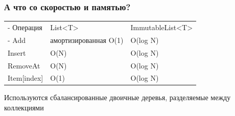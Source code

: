 \documentclass[xetex,mathserif,serif]{beamer}
\begin{document}
	\begin{frame}
		\frametitle{А что со скоростью и памятью?}
		\begin{footnotesize}
			\begin{tabu} {| X[0.9 l p] | X[1 l p] | X[1 l p] |}
				\tabucline-
				Операция     & List<T>                & ImmutableList<T>  \\
				\tabucline-
				\everyrow{\tabucline-}
				Add          & амортизированная O(1)  & O(log N)          \\
				Insert       & O(N)                   & O(log N)          \\
				RemoveAt     & O(N)                   & O(log N)          \\
				Item[index]  & O(1)                   & O(log N)          \\
			\end{tabu}
		\end{footnotesize}
		\vspace{5mm}
		Используются сбалансированные двоичные деревья, разделяемые между коллекциями
	\end{frame}
\end{document}
